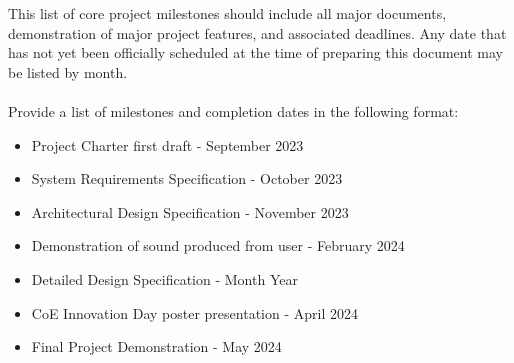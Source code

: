 This list of core project milestones should include all major documents, demonstration of major project features, and associated deadlines. Any date that has not yet been officially scheduled at the time of preparing this document may be listed by month.
\\
\\
Provide a list of milestones and completion dates in the following format:
\begin{itemize}
  \item Project Charter first draft - September 2023
  \item System Requirements Specification - October 2023
  \item Architectural Design Specification - November 2023
  \item Demonstration of sound produced from user - February 2024
  \item Detailed Design Specification - Month Year
  \item CoE Innovation Day poster presentation - April 2024
  \item Final Project Demonstration - May 2024
\end{itemize}

